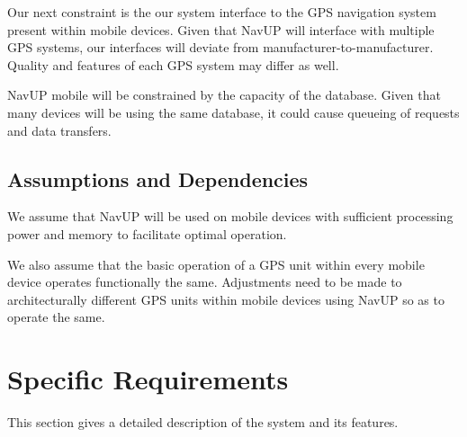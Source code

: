 \documentclass{article}
\begin{document}
        \begin{flushleft}
        Our next constraint is the our system interface to the GPS navigation system present within mobile devices. Given that NavUP will interface with multiple GPS systems, our interfaces will deviate from manufacturer-to-manufacturer. Quality and features of each GPS system may differ as well.
        \end{flushleft}
        
        \begin{flushleft}
        NavUP mobile will be constrained by the capacity of the database. Given that many devices will be using the same database, it could cause queueing of requests and data transfers.
        \end{flushleft}
        \subsection{Assumptions and Dependencies}
        
        \begin{flushleft}
        We assume that NavUP will be used on mobile devices with sufficient processing power and memory to facilitate optimal operation.
        \end{flushleft}
        
        \begin{flushleft}
        We also assume that the basic operation of a GPS unit within every mobile device operates functionally the same. Adjustments need to be made to architecturally different GPS units within mobile devices using NavUP so as to operate the same.
        \end{flushleft}
\section{Specific Requirements}
    \begin{flushleft}
    This section gives a detailed description of the system and its features.
    \end{flushleft}
\end{document}
